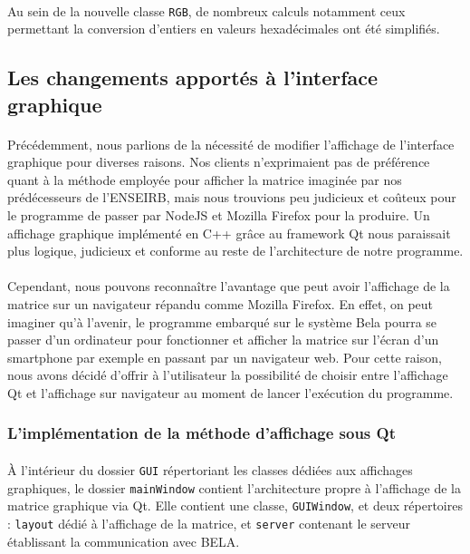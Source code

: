 \paragraph{}
Au sein de la nouvelle classe \verb!RGB!, de nombreux calculs notamment ceux permettant la conversion d'entiers en valeurs hexadécimales ont été simplifiés.

\subsection{Les changements apportés à l'interface graphique}
\paragraph{}
Précédemment, nous parlions de la nécessité de modifier l'affichage de
l'interface graphique pour diverses raisons. Nos clients n'exprimaient
pas de préférence quant à la méthode employée pour afficher la matrice
imaginée par nos prédécesseurs de l'ENSEIRB, mais nous trouvions peu
judicieux et coûteux pour le programme de passer par NodeJS et Mozilla
Firefox pour la produire. Un affichage graphique implémenté en C++
grâce au framework Qt nous paraissait plus logique, judicieux et
conforme au reste de l'architecture de notre programme.
\paragraph{}
Cependant, nous pouvons reconnaître l'avantage que peut avoir
l'affichage de la matrice sur un navigateur répandu comme Mozilla
Firefox. En effet, on peut imaginer qu'à l'avenir, le programme
embarqué sur le système Bela pourra se passer d'un ordinateur pour
fonctionner et afficher la matrice sur l'écran d'un smartphone par
exemple en passant par un navigateur web. Pour cette raison, nous
avons décidé d'offrir à l'utilisateur la possibilité de choisir entre
l'affichage Qt et l'affichage sur navigateur au moment de lancer
l'exécution du programme.

\subsubsection{L'implémentation de la méthode d'affichage sous Qt}
\paragraph{}
\`{A} l'intérieur du dossier \verb!GUI! répertoriant les classes
dédiées aux affichages graphiques, le dossier \verb!mainWindow!
contient l'architecture propre à l'affichage de la matrice graphique
via Qt. Elle contient une classe, \verb!GUIWindow!, et deux
répertoires : \verb!layout! dédié à l'affichage de la matrice, et
\verb!server! contenant le serveur établissant la communication avec
BELA.
